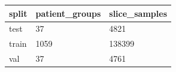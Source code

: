 \begin{tabular}{lll}
\toprule
split & patient\_groups & slice\_samples \\
\midrule
test & 37 & 4821 \\
train & 1059 & 138399 \\
val & 37 & 4761 \\
\bottomrule
\end{tabular}

